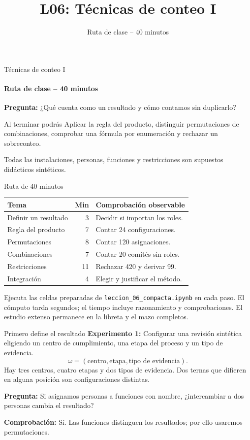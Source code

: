 \documentclass[aspectratio=169,10pt,spanish]{beamer}
\title{L06: Técnicas de conteo I}
\subtitle{Ruta de clase -- 40 minutos}
\author{}
\date{}
\begin{document}
\begin{frame}{Técnicas de conteo I}
\framesubtitle{Ruta de clase -- 40 minutos}
\textbf{Pregunta:} ¿Qué cuenta como un resultado y cómo contamos sin duplicarlo?
\begin{block}{Al terminar podrás}
Aplicar la regla del producto, distinguir permutaciones de combinaciones, comprobar una fórmula por enumeración y rechazar un sobreconteo.
\end{block}
\smallskip
Todas las instalaciones, personas, funciones y restricciones son supuestos didácticos sintéticos.
\end{frame}

\begin{frame}{Ruta de 40 minutos}
\small
\begin{tabular}{p{.42\linewidth}rp{.39\linewidth}}
\toprule Tema & Min & Comprobación observable \\ \midrule
Definir un resultado & 3 & Decidir si importan los roles.\\
Regla del producto & 7 & Contar 24 configuraciones.\\
Permutaciones & 8 & Contar 120 asignaciones.\\
Combinaciones & 7 & Contar 20 comités sin roles.\\
Restricciones & 11 & Rechazar 420 y derivar 99.\\
Integración & 4 & Elegir y justificar el método.\\ \bottomrule
\end{tabular}
\par\medskip
Ejecuta las celdas preparadas de \texttt{leccion\_06\_compacta.ipynb} en cada paso. El cómputo tarda segundos; el tiempo incluye razonamiento y comprobaciones. El estudio extenso permanece en la libreta y el mazo completos.
\end{frame}

\begin{frame}{Primero define el resultado}
\textbf{Experimento 1:} Configurar una revisión sintética eligiendo un centro de cumplimiento, una etapa del proceso y un tipo de evidencia.
\[
\omega=(\text{centro},\text{etapa},\text{tipo de evidencia}).
\]
Hay tres centros, cuatro etapas y dos tipos de evidencia. Dos ternas que difieren en alguna posición son configuraciones distintas.
\par\medskip
\textbf{Pregunta:} Si asignamos personas a funciones con nombre, ¿intercambiar a dos personas cambia el resultado?
\par\smallskip
\textbf{Comprobación:} Sí. Las funciones distinguen los resultados; por ello usaremos permutaciones.
\end{frame}
\end{document}
